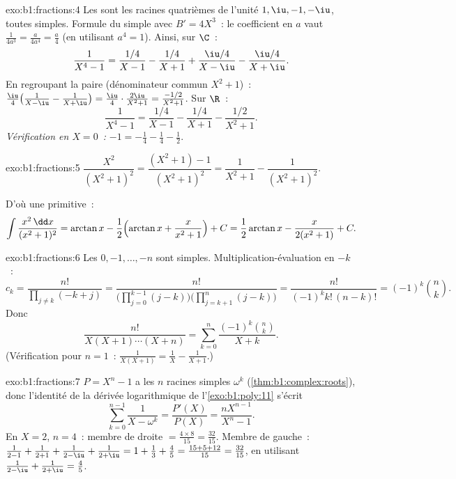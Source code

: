 \begin{solution}{exo:b1:fractions:4}
Les  sont les racines quatrièmes de l'unité $1, \iu, -1, -\iu$,
toutes simples. Formule du  simple avec $B' = 4X^3$~: le coefficient
en $a$ vaut $\frac{1}{4a^3} = \frac{a}{4a^4} = \frac a4$ (en utilisant
$a^4 = 1$). Ainsi, sur $\C$~:
\[
\frac{1}{X^4 - 1}
= \frac{1/4}{X - 1} - \frac{1/4}{X + 1}
+ \frac{\iu/4}{X - \iu} - \frac{\iu/4}{X + \iu} .
\]
En regroupant la paire  (dénominateur commun $X^2 + 1$)~:
$\frac{\iu}{4}\bigl(\frac{1}{X-\iu} - \frac{1}{X+\iu}\bigr) =
\frac{\iu}{4}\cdot\frac{2\iu}{X^2+1} = \frac{-1/2}{X^2+1}$. Sur
$\R$~:
\[
\frac{1}{X^4 - 1}
= \frac{1/4}{X-1} - \frac{1/4}{X+1} - \frac{1/2}{X^2 + 1} .
\]
\emph{Vérification en $X = 0$~:} $-1 = -\frac14 - \frac14 - \frac12$.
\end{solution}

\begin{solution}{exo:b1:fractions:5}
$\dfrac{X^2}{(X^2+1)^2} = \dfrac{(X^2 + 1) - 1}{(X^2+1)^2} =
\dfrac{1}{X^2+1} - \dfrac{1}{(X^2+1)^2}$.

D'où une primitive~:
\[
\int \frac{x^2\,\dd x}{(x^2+1)^2}
= \arctan x - \frac12\Bigl(\arctan x + \frac{x}{x^2+1}\Bigr) + C
= \frac12\arctan x - \frac{x}{2(x^2+1)} + C .
\]
\end{solution}

\begin{solution}{exo:b1:fractions:6}
Les  $0, -1, \dots, -n$ sont simples. Multiplication-évaluation en
$-k$~:
\[
c_k = \frac{n!}{\prod_{j \neq k} (-k + j)}
= \frac{n!}{\bigl(\prod_{j=0}^{k-1}(j - k)\bigr)
\bigl(\prod_{j=k+1}^{n}(j-k)\bigr)}
= \frac{n!}{(-1)^k k!\,(n-k)!} = (-1)^k \binom nk .
\]
Donc
\[
\frac{n!}{X(X+1)\cdots(X+n)}
= \sum_{k=0}^{n} \frac{(-1)^k \binom nk}{X + k} .
\]
(Vérification pour $n = 1$~: $\frac{1}{X(X+1)} = \frac1X -
\frac{1}{X+1}$.)
\end{solution}

\begin{solution}{exo:b1:fractions:7}
$P = X^n - 1$ a les $n$ racines simples $\omega^k$
(\cref{thm:b1:complex:roots}), donc l'identité de la dérivée
logarithmique de l'\cref{exo:b1:poly:11} s'écrit
\[
\sum_{k=0}^{n-1} \frac{1}{X - \omega^k}
= \frac{P'(X)}{P(X)} = \frac{n X^{n-1}}{X^n - 1} .
\]
En $X = 2$, $n = 4$~: membre de droite $= \frac{4 \times 8}{15} =
\frac{32}{15}$. Membre de gauche~: $\frac{1}{2-1} + \frac{1}{2+1} +
\frac{1}{2 - \iu} + \frac{1}{2 + \iu} = 1 + \frac13 + \frac{4}{5} =
\frac{15 + 5 + 12}{15} = \frac{32}{15}$, en utilisant
$\frac{1}{2-\iu} + \frac{1}{2+\iu} = \frac{4}{5}$.
\end{solution}


